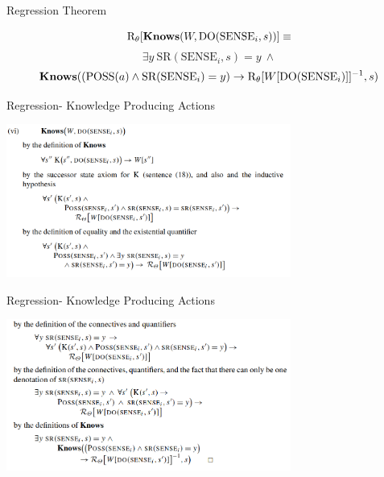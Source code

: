 \begin{frame}{Regression Theorem}

\begin{theorem}

    \[ \text{R}_{\theta}[\textbf{Knows}(W, \text{DO}(\text{SENSE}_i, s))] \equiv \]
    \[ \exists y \ \text{SR}(\text{SENSE}_i, s) = y \ \land \]       
    \[ \textbf{Knows}((\text{POSS}(a) \land \text{SR}(\text{SENSE}_i) = y) \rightarrow \text{R}_{\theta}[W[\text{DO}(\text{SENSE}_i)]]^{-1}, s) \]
\end{theorem}      
\end{frame}

\begin{frame}{Regression- Knowledge Producing Actions}

    \begin{center}
        \includegraphics[width=0.7\textwidth]{assets/proof1.png}
    \end{center}

\end{frame}

\begin{frame}{Regression- Knowledge Producing Actions}

    \begin{center}
        \includegraphics[width=0.7\textwidth]{assets/proof2.png}
    \end{center}

\end{frame}


